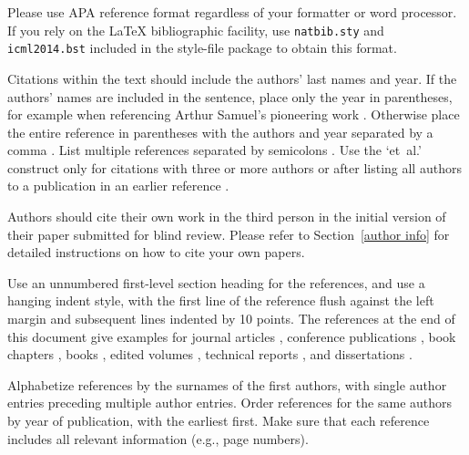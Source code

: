 \documentclass{article}
\begin{document}
Please use APA reference format regardless of your formatter
or word processor. If you rely on the \LaTeX\/ bibliographic 
facility, use {\tt natbib.sty} and {\tt icml2014.bst} 
included in the style-file package to obtain this format.

Citations within the text should include the authors' last names and
year. If the authors' names are included in the sentence, place only
the year in parentheses, for example when referencing Arthur Samuel's
pioneering work . Otherwise place the entire
reference in parentheses with the authors and year separated by a
comma \cite{Samuel59}. List multiple references separated by
semicolons \cite{kearns89,Samuel59,mitchell80}. Use the `et~al.'
construct only for citations with three or more authors or after
listing all authors to a publication in an earlier reference \cite{MachineLearningI}.

Authors should cite their own work in the third person
in the initial version of their paper submitted for blind review.
Please refer to Section~\ref{author info} for detailed instructions on how to
cite your own papers.

Use an unnumbered first-level section heading for the references, and 
use a hanging indent style, with the first line of the reference flush
against the left margin and subsequent lines indented by 10 points. 
The references at the end of this document give examples for journal
articles \cite{Samuel59}, conference publications \cite{langley00}, book chapters \cite{Newell81}, books \cite{DudaHart2nd}, edited volumes \cite{MachineLearningI}, 
technical reports \cite{mitchell80}, and dissertations \cite{kearns89}. 

Alphabetize references by the surnames of the first authors, with
single author entries preceding multiple author entries. Order
references for the same authors by year of publication, with the
earliest first. Make sure that each reference includes all relevant
information (e.g., page numbers).


\nocite{langley00}



\end{document}
